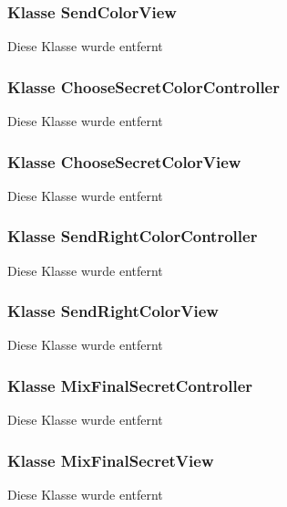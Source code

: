 \documentclass{article}
\begin{document}
	\subsubsection{Klasse SendColorView}
    Diese Klasse wurde entfernt

	\subsubsection{Klasse ChooseSecretColorController}
    Diese Klasse wurde entfernt

	\subsubsection{Klasse ChooseSecretColorView}
    Diese Klasse wurde entfernt

	\subsubsection{Klasse SendRightColorController}
    Diese Klasse wurde entfernt

	\subsubsection{Klasse SendRightColorView}
    Diese Klasse wurde entfernt

	\subsubsection{Klasse MixFinalSecretController}
    Diese Klasse wurde entfernt

	\subsubsection{Klasse MixFinalSecretView}
    Diese Klasse wurde entfernt
	
 \restoregeometry

\glsaddall
\printglossary[numberedsection, style=altlist]
\end{document}
